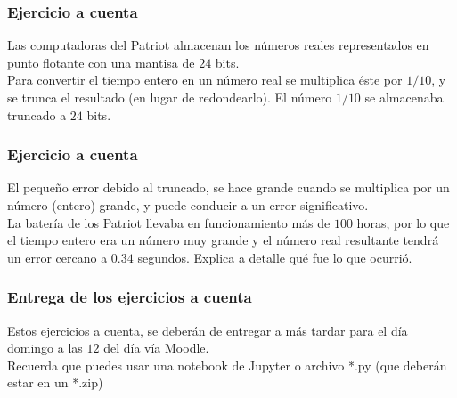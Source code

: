 \documentclass[12pt]{beamer}
\begin{document}
\begin{frame}
\frametitle{Ejercicio a cuenta}
Las computadoras del Patriot almacenan los números reales representados en punto flotante con una mantisa de $24$ bits.
\\
\bigskip
\pause
Para convertir el tiempo entero en un número real se multiplica éste por $1/10$, y se trunca el resultado (en lugar de redondearlo). El número $1/10$ se almacenaba truncado a $24$ bits.
\end{frame}
\begin{frame}
\frametitle{Ejercicio a cuenta}
El pequeño error debido al truncado, se hace grande cuando se multiplica por un número (entero) grande, y puede conducir a un error significativo.
\\
\bigskip
La batería de los Patriot llevaba en funcionamiento más de $100$ horas, por lo que el tiempo entero era un número muy grande y el número real resultante tendrá un error cercano a $0.34$ segundos. \pause Explica a detalle qué fue lo que ocurrió.
\end{frame}
\begin{frame}
\frametitle{Entrega de los ejercicios a cuenta}
Estos ejercicios a cuenta, se deberán de entregar a más tardar para el día domingo a las $12$ del día vía Moodle.
\\
\bigskip
Recuerda que puedes usar una notebook de Jupyter o archivo *.py (que deberán estar en un *.zip)
\end{frame}
\end{document}
